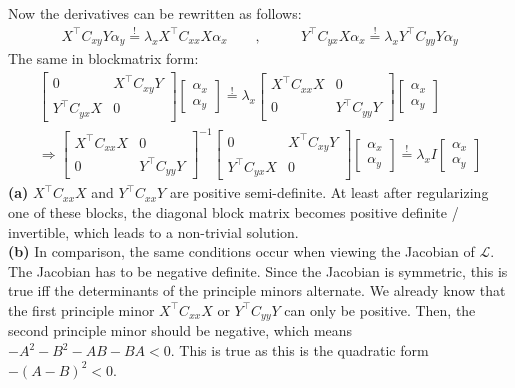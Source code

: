 \documentclass[a4paper]{article}
\newcommand{\eqq}{  \overset{\text{!}}{=} }
\newcommand{\Yt}{{Y^\top}}
\newcommand{\Xt}{{X^\top}}
\newcommand{\lx}{{\lambda_{x}}}
\newcommand{\ax}{{\alpha_{x}}}
\newcommand{\ay}{{\alpha_{y}}}
\newcommand{\Cxx}{C_{xx}}
\newcommand{\Cxy}{C_{xy}}
\newcommand{\Cyx}{C_{yx}}
\newcommand{\Cyy}{C_{yy}}
\newcommand{\1}{\mathds{1}}
\newcommand{\lag}{\mathcal{L}}
\begin{document}
Now the derivatives can be rewritten as follows:
\begin{align*}
	\Xt\Cxy Y\ay \eqq \lx\Xt\Cxx X\ax 
	\quad\quad ,&\quad\quad
	\Yt\Cyx X\ax \eqq \lx\Yt\Cyy Y\ay
\end{align*} 
The same in blockmatrix form:
\begin{align*}
	\begin{bmatrix}
	0 & \Xt\Cxy Y  \\
	\Yt\Cyx X & 0 
	\end{bmatrix}
	\begin{bmatrix}
	 \ax  \\
	 \ay
	\end{bmatrix}
\eqq	 
	 \lx		
	\begin{bmatrix}
	\Xt\Cxx X & 0 \\
	0 & \Yt\Cyy Y  
	\end{bmatrix}
	\begin{bmatrix}
	 \ax  \\
	 \ay
	\end{bmatrix}
\\
\Longrightarrow
	\begin{bmatrix}
	\Xt\Cxx X & 0 \\
	0 & \Yt\Cyy Y  
	\end{bmatrix}^{-1}
	\begin{bmatrix}
	0 & \Xt\Cxy Y  \\
	\Yt\Cyx X & 0 
	\end{bmatrix}
	\begin{bmatrix}
	 \ax  \\
	 \ay
	\end{bmatrix}
\eqq	 
	 \lx		
	I
	\begin{bmatrix}
	 \ax  \\
	 \ay
	\end{bmatrix}
\end{align*}
\textbf{(a)} $\Xt\Cxx X$ and $\Yt\Cxx Y$ are positive semi-definite. 
At least after regularizing one of these blocks, the diagonal block matrix
becomes positive definite / invertible, which leads to a non-trivial 
solution. \\
\textbf{(b)} In comparison, the same conditions occur when viewing the Jacobian of $\lag$. 
The Jacobian has to be negative definite. 
Since the Jacobian is symmetric, this is true iff
the determinants of the principle minors alternate. 
We already know that the 
first principle minor $\Xt\Cxx X$ or $\Yt\Cyy Y$ can only be positive. 
Then, the second principle minor
should be negative, which means $-A^2-B^2-AB-BA<0$. 
This is true as this is the quadratic form $-(A-B)^2<0$. 
\end{document}
